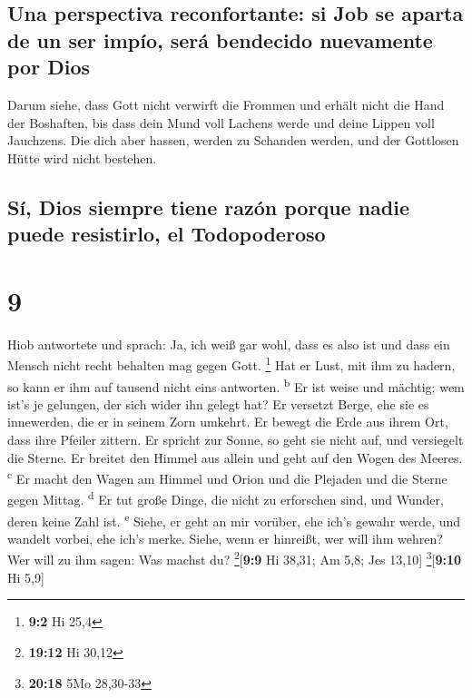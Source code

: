 \hypertarget{una-perspectiva-reconfortante-si-job-se-aparta-de-un-ser-impuxedo-seruxe1-bendecido-nuevamente-por-dios}{%
\subsection{Una perspectiva reconfortante: si Job se aparta de un ser
impío, será bendecido nuevamente por
Dios}\label{una-perspectiva-reconfortante-si-job-se-aparta-de-un-ser-impuxedo-seruxe1-bendecido-nuevamente-por-dios}}

 Darum siehe, dass Gott nicht verwirft die Frommen und
erhält nicht die Hand der Boshaften,  bis dass dein Mund
voll Lachens werde und deine Lippen voll Jauchzens.  Die
dich aber hassen, werden zu Schanden werden, und der Gottlosen Hütte
wird nicht bestehen.

\hypertarget{suxed-dios-siempre-tiene-razuxf3n-porque-nadie-puede-resistirlo-el-todopoderoso}{%
\subsection{Sí, Dios siempre tiene razón porque nadie puede resistirlo,
el
Todopoderoso}\label{suxed-dios-siempre-tiene-razuxf3n-porque-nadie-puede-resistirlo-el-todopoderoso}}

\hypertarget{section-8}{%
\section{9}\label{section-8}}

 Hiob antwortete und sprach:  Ja, ich weiß
gar wohl, dass es also ist und dass ein Mensch nicht recht behalten mag
gegen Gott. \footnote{\textbf{9:2} Hi 25,4}  Hat er Lust,
mit ihm zu hadern, so kann er ihm auf tausend nicht eins antworten.
\textsuperscript{b}  Er ist weise und mächtig; wem ist's
je gelungen, der sich wider ihn gelegt hat?  Er versetzt
Berge, ehe sie es innewerden, die er in seinem Zorn umkehrt.
 Er bewegt die Erde aus ihrem Ort, dass ihre Pfeiler
zittern.  Er spricht zur Sonne, so geht sie nicht auf, und
versiegelt die Sterne.  Er breitet den Himmel aus allein
und geht auf den Wogen des Meeres. \textsuperscript{c}  Er
macht den Wagen am Himmel und Orion und die Plejaden und die Sterne
gegen Mittag. \textsuperscript{d}  Er tut große Dinge,
die nicht zu erforschen sind, und Wunder, deren keine Zahl ist.
\textsuperscript{e}  Siehe, er geht an mir vorüber, ehe
ich's gewahr werde, und wandelt vorbei, ehe ich's merke. 
Siehe, wenn er hinreißt, wer will ihm wehren? Wer will zu ihm sagen: Was
machst du? \footnote{\textbf{19:12} Hi 30,12}{[}\textbf{9:9} Hi 38,31;
Am 5,8; Jes 13,10{]} \footnote{\textbf{20:18} 5Mo 28,30-33}{[}\textbf{9:10}
Hi 5,9{]}

